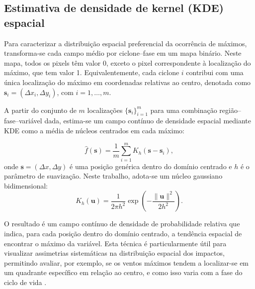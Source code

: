 \subsection{Estimativa de densidade de kernel (KDE) espacial}\label{subsec:kde_localizacion}
Para caracterizar a distribuição espacial preferencial da ocorrência de máximos, transforma-se cada campo médio por ciclone--fase em um mapa binário. Neste mapa, todos os pixels têm valor 0, exceto o pixel correspondente à localização do máximo, que tem valor 1. Equivalentemente, cada ciclone $i$ contribui com uma única localização do máximo em coordenadas relativas ao centro, denotada como $\mathbf{s}_i=(\Delta x_i,\Delta y_i)$, com $i=1,\dots,m$.

A partir do conjunto de $m$ localizações $\{\mathbf{s}_i\}_{i=1}^{m}$ para uma combinação região--fase--variável dada, estima-se um campo contínuo de densidade espacial mediante KDE como a média de núcleos centrados em cada máximo:

\begin{equation}
\hat f(\mathbf{s})=\frac{1}{m}\sum_{i=1}^{m} K_h(\mathbf{s}-\mathbf{s}_i),
\label{eq:kde_simple}
\end{equation}
onde $\mathbf{s}=(\Delta x,\Delta y)$ é uma posição genérica dentro do domínio centrado e $h$ é o parâmetro de suavização. Neste trabalho, adota-se um núcleo gaussiano bidimensional:
\begin{equation}
K_h(\mathbf{u})=\frac{1}{2\pi h^2}\exp\!\left(-\frac{\|\mathbf{u}\|^2}{2h^2}\right).
\label{eq:gauss_kernel_2d_simple}
\end{equation}

O resultado é um campo contínuo de densidade de probabilidade relativa que indica, para cada posição dentro do domínio centrado, a tendência espacial de encontrar o máximo da variável. Esta técnica é particularmente útil para visualizar assimetrias sistemáticas na distribuição espacial dos impactos, permitindo avaliar, por exemplo, se os ventos máximos tendem a localizar-se em um quadrante específico em relação ao centro, e como isso varia com a fase do ciclo de vida \citep{gramcianinov2023impact}.


